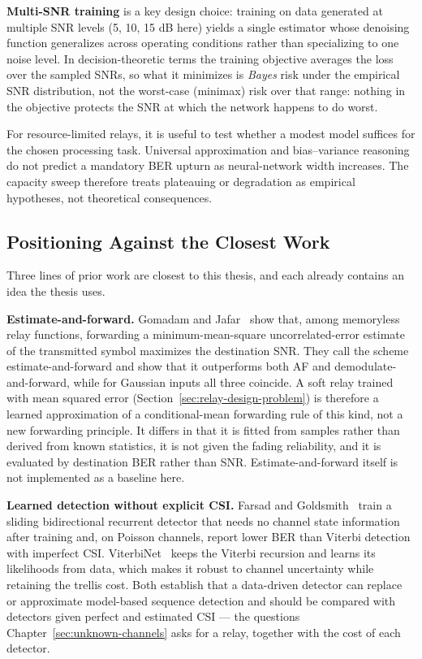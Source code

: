 \textbf{Multi-SNR training} is a key design choice: training on data generated at multiple SNR levels (5, 10, 15 dB here) yields a single estimator whose denoising function generalizes across operating conditions rather than specializing to one noise level. In decision-theoretic terms the training objective averages the loss over the sampled SNRs, so what it minimizes is \emph{Bayes} risk under the empirical SNR distribution, not the worst-case (minimax) risk over that range: nothing in the objective protects the SNR at which the network happens to do worst.

For resource-limited relays, it is useful to test whether a modest model suffices for the chosen processing task. Universal approximation and bias--variance reasoning do not predict a mandatory BER upturn as neural-network width increases. The capacity sweep therefore treats plateauing or degradation as empirical hypotheses, not theoretical consequences.

\subsection{Positioning Against the Closest Work}\label{sec:positioning-closest-work}

Three lines of prior work are closest to this thesis, and each already contains an idea the thesis uses.

\textbf{Estimate-and-forward.} Gomadam and Jafar~\cite{GomadamJafar2007EF} show that, among memoryless relay functions, forwarding a minimum-mean-square uncorrelated-error estimate of the transmitted symbol maximizes the destination SNR. They call the scheme estimate-and-forward and show that it outperforms both AF and demodulate-and-forward, while for Gaussian inputs all three coincide. A soft relay trained with mean squared error (Section~\ref{sec:relay-design-problem}) is therefore a learned approximation of a conditional-mean forwarding rule of this kind, not a new forwarding principle. It differs in that it is fitted from samples rather than derived from known statistics, it is not given the fading reliability, and it is evaluated by destination BER rather than SNR. Estimate-and-forward itself is not implemented as a baseline here.

\textbf{Learned detection without explicit CSI.} Farsad and Goldsmith~\cite{FarsadGoldsmith2018NNDetection} train a sliding bidirectional recurrent detector that needs no channel state information after training and, on Poisson channels, report lower BER than Viterbi detection with imperfect CSI. ViterbiNet~\cite{Shlezinger2020ViterbiNet} keeps the Viterbi recursion and learns its likelihoods from data, which makes it robust to channel uncertainty while retaining the trellis cost. Both establish that a data-driven detector can replace or approximate model-based sequence detection and should be compared with detectors given perfect and estimated CSI --- the questions Chapter~\ref{sec:unknown-channels} asks for a relay, together with the cost of each detector.

